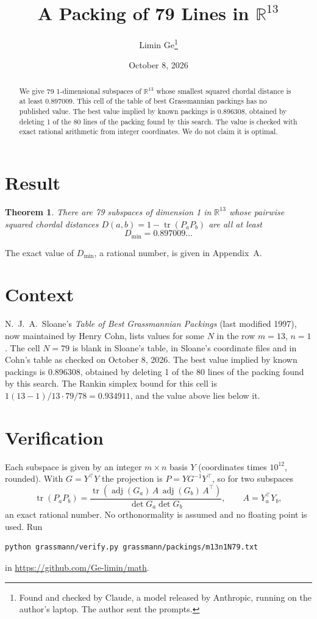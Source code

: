 \documentclass[11pt,a4paper]{article}
\title{A Packing of 79 Lines in $\mathbb{R}^{13}$}
\author{Limin Ge\thanks{Found and checked by Claude, a model released by Anthropic, running on the author's laptop. The author sent the prompts.}}
\date{October 8, 2026}
\newtheorem*{theorem}{Theorem}
\begin{document}
\maketitle
\begin{abstract}
We give 79 1-dimensional subspaces of $\mathbb{R}^{13}$ whose smallest squared chordal distance is at least 0.897009. This cell of the table of best Grassmannian packings has no published value. The best value implied by known packings is 0.896308, obtained by deleting 1 of the 80 lines of the packing found by this search. The value is checked with exact rational arithmetic from integer coordinates. We do not claim it is optimal.
\end{abstract}

\section{Result}
\begin{theorem}
There are 79 subspaces of dimension 1 in $\mathbb{R}^{13}$ whose pairwise squared chordal distances $D(a,b) = 1 - \operatorname{tr}(P_aP_b)$ are all at least
\[ D_{\min} = 0.897009\ldots \]
\end{theorem}
The exact value of $D_{\min}$, a rational number, is given in Appendix~A.


\section{Context}
N.~J.~A.~Sloane's \emph{Table of Best Grassmannian Packings} (last modified 1997), now maintained by Henry Cohn, lists values for some $N$ in the row $m=13$, $n=1$. The cell $N=79$ is blank in Sloane's table, in Sloane's coordinate files and in Cohn's table as checked on October 8, 2026. The best value implied by known packings is 0.896308, obtained by deleting 1 of the 80 lines of the packing found by this search. The Rankin simplex bound for this cell is $1(13-1)/13\cdot 79/78 = 0.934911$, and the value above lies below it.


\section{Verification}
Each subspace is given by an integer $m\times n$ basis $Y$ (coordinates times $10^{12}$, rounded). With $G=Y^\top Y$ the projection is $P=YG^{-1}Y^\top$, so for two subspaces
\[ \operatorname{tr}(P_aP_b)=\frac{\operatorname{tr}(\operatorname{adj}(G_a)\,A\,\operatorname{adj}(G_b)\,A^\top)}{\det G_a\det G_b},\qquad A=Y_a^\top Y_b, \]
an exact rational number. No orthonormality is assumed and no floating point is used. Run
\begin{verbatim}
python grassmann/verify.py grassmann/packings/m13n1N79.txt
\end{verbatim}
in \url{https://github.com/Ge-limin/math}.
\end{document}
